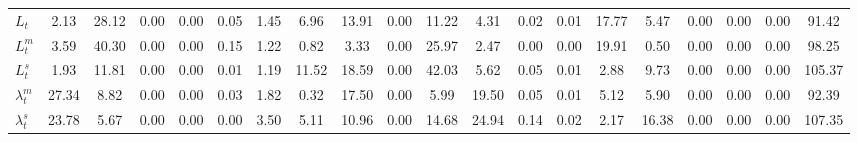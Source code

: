 \begin{center}
\begin{longtable}{lccccccccccccccccccc}
$ L_t                       $	 & 	                2.13	 & 	               28.12	 & 	                0.00	 & 	                0.00	 & 	                0.05	 & 	                1.45	 & 	                6.96	 & 	               13.91	 & 	                0.00	 & 	               11.22	 & 	                4.31	 & 	                0.02	 & 	                0.01	 & 	               17.77	 & 	                5.47	 & 	                0.00	 & 	                0.00	 & 	                0.00	 & 	               91.42 \\ 
$ L^m_t                     $	 & 	                3.59	 & 	               40.30	 & 	                0.00	 & 	                0.00	 & 	                0.15	 & 	                1.22	 & 	                0.82	 & 	                3.33	 & 	                0.00	 & 	               25.97	 & 	                2.47	 & 	                0.00	 & 	                0.00	 & 	               19.91	 & 	                0.50	 & 	                0.00	 & 	                0.00	 & 	                0.00	 & 	               98.25 \\ 
$ L^s_t                     $	 & 	                1.93	 & 	               11.81	 & 	                0.00	 & 	                0.00	 & 	                0.01	 & 	                1.19	 & 	               11.52	 & 	               18.59	 & 	                0.00	 & 	               42.03	 & 	                5.62	 & 	                0.05	 & 	                0.01	 & 	                2.88	 & 	                9.73	 & 	                0.00	 & 	                0.00	 & 	                0.00	 & 	              105.37 \\ 
$ \lambda^m_t               $	 & 	               27.34	 & 	                8.82	 & 	                0.00	 & 	                0.00	 & 	                0.03	 & 	                1.82	 & 	                0.32	 & 	               17.50	 & 	                0.00	 & 	                5.99	 & 	               19.50	 & 	                0.05	 & 	                0.01	 & 	                5.12	 & 	                5.90	 & 	                0.00	 & 	                0.00	 & 	                0.00	 & 	               92.39 \\ 
$ \lambda^s_t               $	 & 	               23.78	 & 	                5.67	 & 	                0.00	 & 	                0.00	 & 	                0.00	 & 	                3.50	 & 	                5.11	 & 	               10.96	 & 	                0.00	 & 	               14.68	 & 	               24.94	 & 	                0.14	 & 	                0.02	 & 	                2.17	 & 	               16.38	 & 	                0.00	 & 	                0.00	 & 	                0.00	 & 	              107.35 \\ 

\end{longtable}
\end{center}
